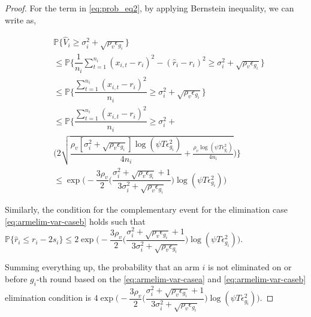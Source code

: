 \begin{proof}
  
For the term in \ref{eq:prob_eq2}, by applying Bernstein inequality, we can write as,
\begin{small}
\begin{align*}
&\mathbb{P}\bigg\lbrace \hat{V}_{i}\geq \sigma_{i}^{2}+\sqrt{\rho_{v}\epsilon_{g_{i}}}\bigg\rbrace\\
&\leq \mathbb{P}\bigg\lbrace \dfrac{1}{n_{i}}\sum_{t=1}^{n_{i}}(x_{i,t}-r_{i})^{2}-(\hat{r}_{i}-r_{i})^{2}\geq \sigma_{i}^{2}+\sqrt{\rho_{v}\epsilon_{g_{i}}}\bigg\rbrace\\
&\leq \mathbb{P}\bigg\lbrace \dfrac{\sum_{t=1}^{n_{i}}(x_{i,t}-r_{i})^{2}}{n_{i}}\geq \sigma_{i}^{2}+\sqrt{\rho_{v}\epsilon_{g_{i}}} \bigg\rbrace\\
&\leq \mathbb{P}\bigg\lbrace \dfrac{\sum_{t=1}^{n_{i}}(x_{i,t}-r_{i})^{2}}{n_{i}}\geq \sigma_{i}^{2} +\\
&\bigg(2\sqrt{\dfrac{\rho_v [\sigma_{i}^{2}+\sqrt{\rho_{v}\epsilon_{g_{i}}}]\log(\psi T\epsilon_{g_{i}}^{2})}{4n_{i}}+\frac{\rho_v \log{(\psi T\epsilon_{g_{i}}^{2})}}{4 n_{i}}}\bigg)\bigg\rbrace\\
&\leq \exp\bigg(- \dfrac{3\rho_v}{2} \bigg(\dfrac{\sigma_{i}^{2}+\sqrt{\rho_{v}\epsilon_{g_{i}}}+1}{3\sigma_{i}^{2}+\sqrt{\rho_v \epsilon_{g_{i}}}}\bigg) \log(\psi T\epsilon_{g_{i}}^{2}) \bigg) 
\end{align*}
\end{small}
 
  
Similarly, the condition for the complementary event for the elimination case \ref{eq:armelim-var-caseb} holds such that $\mathbb{P}\lbrace\hat{r}_{i}\leq r_{i} - 2s_{i}\rbrace \leq 2\exp\bigg(- \dfrac{3\rho_v}{2} \bigg(\dfrac{\sigma_{i}^{2}+\sqrt{\rho_{v}\epsilon_{g_{i}}}+1}{3\sigma_{i}^{2}+\sqrt{\rho_v \epsilon_{g_{i}}}}\bigg) \log(\psi T\epsilon_{g_{i}}^{2}) \bigg)$.

  Summing everything up, the probability that an arm ${i}$ is not eliminated on or before $g_{i}$-th round based on the \ref{eq:armelim-var-casea} and \ref{eq:armelim-var-caseb} elimination condition is  $4\exp\bigg(- \dfrac{3\rho_v}{2} \bigg(\dfrac{\sigma_{i}^{2}+\sqrt{\rho_{v}\epsilon_{g_{i}}}+1}{3\sigma_{i}^{2}+\sqrt{\rho_v \epsilon_{g_{i}}}}\bigg) \log(\psi T\epsilon_{g_{i}}^{2}) \bigg)$. 
  

\end{proof}
